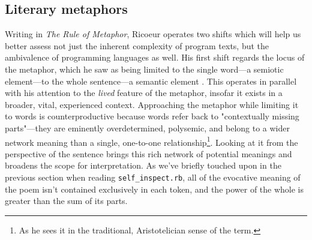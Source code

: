 \subsection{Literary metaphors}
\label{subsec:literary-metaphors}

Writing in \emph{The Rule of Metaphor}, Ricoeur operates two shifts which will help us better assess not just the inherent complexity of program texts, but the ambivalence of programming languages as well. His first shift regards the locus of the metaphor, which he saw as being limited to the single word—a semiotic element—to the whole sentence—a semantic element \citep{ricoeur_rule_2003}. This operates in parallel with his attention to the \emph{lived} feature of the metaphor, insofar it exists in a broader, vital, experienced context. Approaching the metaphor while limiting it to words is counterproductive because words refer back to "contextually missing parts"—they are eminently overdetermined, polysemic, and belong to a wider network meaning than a single, one-to-one relationship\footnote{As he sees it in the traditional, Aristotelician sense of the term.}. Looking at it from the perspective of the sentence brings this rich network of potential meanings and broadens the scope for interpretation. As we've briefly touched upon in the previous section when reading \lstinline{self_inspect.rb}, all of the evocative meaning of the poem isn't contained exclusively in each token, and the power of the whole is greater than the sum of its parts.


